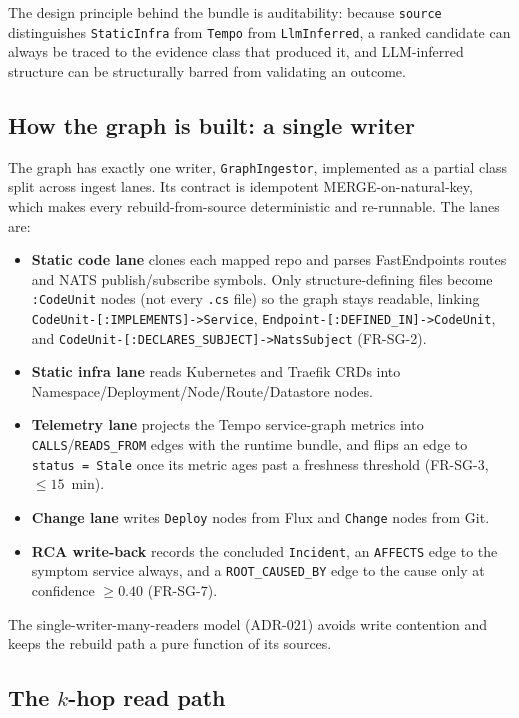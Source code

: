\documentclass[11pt]{article}
\begin{document}
The design principle behind the bundle is auditability: because \texttt{source}
distinguishes \texttt{StaticInfra} from \texttt{Tempo} from \texttt{LlmInferred},
a ranked candidate can always be traced to the evidence class that produced it,
and LLM-inferred structure can be structurally barred from validating an outcome.

\subsection{How the graph is built: a single writer}

The graph has exactly one writer, \texttt{GraphIngestor}, implemented as a
partial class split across ingest lanes. Its contract is idempotent
MERGE-on-natural-key, which makes every rebuild-from-source deterministic and
re-runnable. The lanes are:

\begin{itemize}
  \item \textbf{Static code lane} clones each mapped repo and parses FastEndpoints
  routes and NATS publish/subscribe symbols. Only structure-defining files become
  \texttt{:CodeUnit} nodes (not every \texttt{.cs} file) so the graph stays
  readable, linking \texttt{CodeUnit-[:IMPLEMENTS]->Service},
  \texttt{Endpoint-[:DEFINED\_IN]->CodeUnit}, and
  \texttt{CodeUnit-[:DECLARES\_SUBJECT]->NatsSubject} (FR-SG-2).
  \item \textbf{Static infra lane} reads Kubernetes and Traefik CRDs into
  Namespace/Deployment/Node/Route/Datastore nodes.
  \item \textbf{Telemetry lane} projects the Tempo service-graph metrics into
  \texttt{CALLS}/\texttt{READS\_FROM} edges with the runtime bundle, and flips an
  edge to \texttt{status = Stale} once its metric ages past a freshness threshold
  (FR-SG-3, $\leq 15$~min).
  \item \textbf{Change lane} writes \texttt{Deploy} nodes from Flux and
  \texttt{Change} nodes from Git.
  \item \textbf{RCA write-back} records the concluded \texttt{Incident}, an
  \texttt{AFFECTS} edge to the symptom service always, and a
  \texttt{ROOT\_CAUSED\_BY} edge to the cause only at confidence $\geq 0.40$
  (FR-SG-7).
\end{itemize}

The single-writer-many-readers model (ADR-021) avoids write contention and keeps
the rebuild path a pure function of its sources.

\subsection{The $k$-hop read path}
\end{document}

